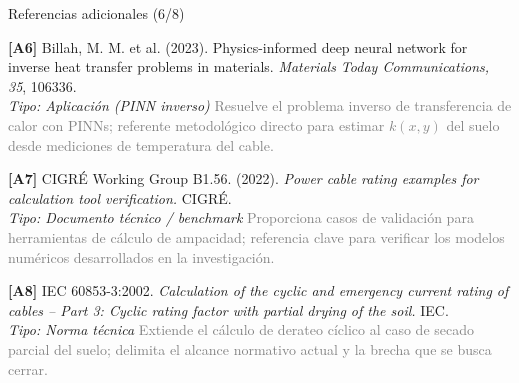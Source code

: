 \documentclass[aspectratio=169]{beamer}
\begin{document}
\begin{frame}{Referencias adicionales (6/8)}
\small\justifying

\textbf{[A6]} Billah, M. M. et al. (2023). Physics-informed deep neural
network for inverse heat transfer problems in materials. \textit{Materials
Today Communications, 35}, 106336.\\
\textcolor{purple!70!black}{\footnotesize\textit{Tipo: Aplicación (PINN inverso)}} \quad
\textcolor{gray}{\footnotesize Resuelve el problema inverso de transferencia de
calor con PINNs; referente metodológico directo para estimar $k(x,y)$ del
suelo desde mediciones de temperatura del cable.}

\medskip
\textbf{[A7]} CIGRÉ Working Group B1.56. (2022). \textit{Power cable rating
examples for calculation tool verification.} CIGRÉ.\\
\textcolor{purple!70!black}{\footnotesize\textit{Tipo: Documento técnico / benchmark}} \quad
\textcolor{gray}{\footnotesize Proporciona casos de validación para herramientas
de cálculo de ampacidad; referencia clave para verificar los modelos
numéricos desarrollados en la investigación.}

\medskip
\textbf{[A8]} IEC 60853-3:2002. \textit{Calculation of the cyclic and
emergency current rating of cables -- Part 3: Cyclic rating factor with
partial drying of the soil.} IEC.\\
\textcolor{purple!70!black}{\footnotesize\textit{Tipo: Norma técnica}} \quad
\textcolor{gray}{\footnotesize Extiende el cálculo de derateo cíclico al caso
de secado parcial del suelo; delimita el alcance normativo actual y la
brecha que se busca cerrar.}
\end{frame}
\end{document}
